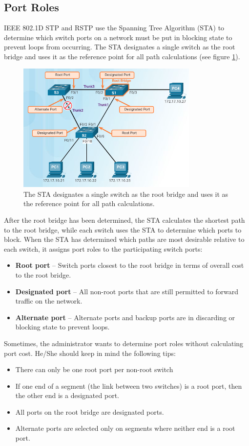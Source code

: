 \subsection{Port Roles}
IEEE 802.1D STP and RSTP use the Spanning Tree Algorithm (STA) to determine which switch ports on a network must be put in blocking state to prevent loops from occurring. The STA designates a single switch as the root bridge and uses it as the reference point for all path calculations (see figure \ref{STP-operation}). \par 
\begin{figure}[hbtp]
\centering
\includegraphics[width=0.8\textwidth]{pictures/STP-operation.png}
\caption{The STA designates a single switch as the root bridge and uses it as the reference point for all path calculations.}
\label{STP-operation}
\end{figure}
After  the root bridge has been determined, the STA calculates the shortest path to the root bridge, while each switch uses the STA to determine which ports to block.  When the STA has determined which paths are most desirable relative to each switch, it assigns port roles to the participating switch ports:
\begin{itemize}
\item \textbf{Root port} -- Switch ports closest to the root bridge in terms of overall cost to the root bridge.
\item \textbf{Designated port} -- All non-root ports that are still permitted to forward traffic on the network.
\item \textbf{Alternate port} -- Alternate ports and backup ports are in discarding or blocking state to prevent loops. 
\end{itemize}
Sometimes, the administrator wants to determine port roles without calculating port cost. He/She should keep in mind the following tips:
\begin{itemize}
\item There can only be one root port per non-root switch
\item If one end of a segment (the link between two switches) is a root port, then the other end is a designated port.
\item All ports on the root bridge are designated ports.
\item Alternate ports are selected only on segments where neither end is a root port.
\end{itemize}
